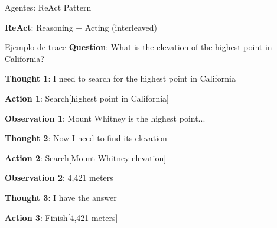 \begin{frame}{Agentes: ReAct Pattern}

\textbf{ReAct}: Reasoning + Acting (interleaved)

\vspace{0.5em}

\begin{block}{Ejemplo de trace}
\small
\textbf{Question}: What is the elevation of the highest point in California?

\vspace{0.3em}
\textbf{Thought 1}: I need to search for the highest point in California

\textbf{Action 1}: Search[highest point in California]

\textbf{Observation 1}: Mount Whitney is the highest point...

\vspace{0.3em}
\textbf{Thought 2}: Now I need to find its elevation

\textbf{Action 2}: Search[Mount Whitney elevation]

\textbf{Observation 2}: 4,421 meters

\vspace{0.3em}
\textbf{Thought 3}: I have the answer

\textbf{Action 3}: Finish[4,421 meters]
\end{block}

\end{frame}

